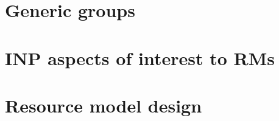 

\section{Generic groups}


\section{INP aspects of interest to RMs}


\section{Resource model design} \label{model_design}
